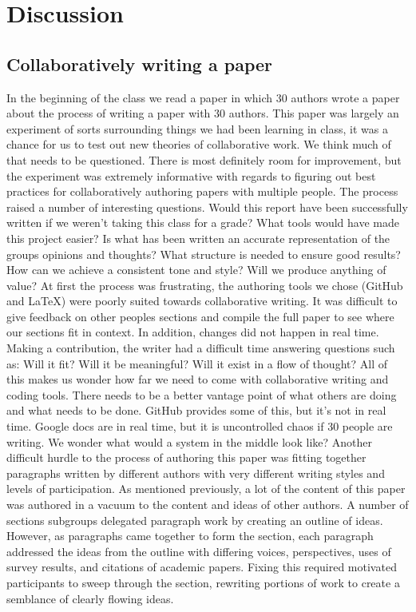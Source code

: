 \section{Discussion}

\subsection{Collaboratively writing a paper}
In the beginning of the class we read a paper \cite{tomlinson2012} in which 30 authors wrote a paper about the process of writing a paper with 30 authors. This paper was largely an experiment of sorts surrounding things we had been learning in class, it was a chance for us to test out new theories of collaborative work.
We think much of that needs to be questioned. There is most definitely room for improvement, but the experiment was extremely informative with regards to figuring out best practices for collaboratively authoring papers with multiple people.  
The process raised a number of interesting questions.
Would this report have been successfully written if we weren't taking this class for a grade?
What tools would have made this project easier? 
Is what has been written an accurate representation of the groups opinions and thoughts? 
What structure is needed to ensure good results?
How can we achieve a consistent tone and style? 
Will we produce anything of value?
At first the process was frustrating, the authoring tools we chose (GitHub and LaTeX) were poorly suited towards collaborative writing. It was difficult to give feedback on other peoples sections and compile the full paper to see where our sections fit in context. In addition, changes did not happen in real time. Making a contribution, the writer had a difficult time answering questions such as: Will it fit? Will it be meaningful? Will it exist in a flow of thought? All of this makes us wonder how far we need to come with collaborative writing and coding tools. There needs to be a better vantage point of what others are doing and what needs to be done. GitHub provides some of this, but it's not in real time. Google docs are in real time, but it is uncontrolled chaos if 30 people are writing. We wonder what would a system in the middle look like? 
Another difficult hurdle to the process of authoring this paper was fitting together paragraphs written by different authors with very different writing styles and levels of participation. As mentioned previously, a lot of the content of this paper was authored in a vacuum to the content and ideas of other authors. A number of sections subgroups delegated paragraph work by creating an outline of ideas. However, as paragraphs came together to form the section, each paragraph addressed the ideas from the outline with differing voices, perspectives, uses of survey results, and citations of academic papers. Fixing this required motivated participants to sweep through the section, rewriting portions of work to create a semblance of clearly flowing ideas.

